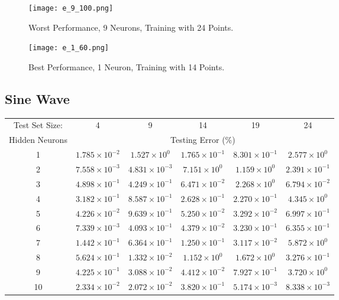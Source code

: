 \documentclass{article}
\begin{document}
		\begin{figure}[!ht]
			\texttt{[image: e\_9\_100.png]}
			\caption{Worst Performance, 9 Neurons, Training with 24 Points.}
			\label{F_E_1}
		\end{figure}
		\begin{figure}[!ht]
			\texttt{[image: e\_1\_60.png]}
			\caption{Best Performance, 1 Neuron, Training with 14 Points.}
			\label{F_E_2}
		\end{figure}
\pagebreak
	\subsection{Sine Wave}
		\begin{minipage}{\linewidth}
			\centering
			\begin{tabular}{c|ccccc}\label{T4}
				Test Set Size:  & 4 & 9 & 14 & 19 & 24 \\
				Hidden Neurons  & \multicolumn{5}{c}{Testing Error (\%)} \\
				\hline\noalign{\smallskip}
				1	& $1.785\times 10^{-2}$	& $1.527\times 10^{0}$ & $1.765\times 10^{-1}$ & $8.301\times 10^{-1}$ & $2.577\times 10^{0}$ \\
				2	& $7.558\times 10^{-3}$	& $4.831\times 10^{-3}$ & $7.151\times 10^{0}$ & $1.159\times 10^{0}$ & $2.391\times 10^{-1}$ \\
				3	& $4.898\times 10^{-1}$	& $4.249\times 10^{-1}$ & $6.471\times 10^{-2}$ & $2.268\times 10^{0}$ & $6.794\times 10^{-2}$ \\
				4	& $3.182\times 10^{-1}$	& $8.587\times 10^{-1}$ & $2.628\times 10^{-1}$ & $2.270\times 10^{-1}$ & $4.345\times 10^{0}$ \\
				5	& $4.226\times 10^{-2}$	& $9.639\times 10^{-1}$ & $5.250\times 10^{-2}$ & $3.292\times 10^{-2}$ & $6.997\times 10^{-1}$ \\
				6	& $7.339\times 10^{-3}$	& $4.093\times 10^{-1}$ & $4.379\times 10^{-2}$ & $3.230\times 10^{-1}$ & $6.355\times 10^{-1}$ \\
				7	& $1.442\times 10^{-1}$	& $6.364\times 10^{-1}$ & $1.250\times 10^{-1}$ & $3.117\times 10^{-2}$ & $5.872\times 10^{0}$ \\
				8	& $5.624\times 10^{-1}$	& $1.332\times 10^{-2}$ & $1.152\times 10^{0}$ & $1.672\times 10^{0}$ & $3.276\times 10^{-1}$ \\
				9	& $4.225\times 10^{-1}$	& $3.088\times 10^{-2}$ & $4.412\times 10^{-2}$ & $7.927\times 10^{-1}$ & $3.720\times 10^{0}$ \\
				10	& $2.334\times 10^{-2}$	& $2.072\times 10^{-2}$ & $3.820\times 10^{-1}$ & $5.174\times 10^{-3}$ & $8.338\times 10^{-3}$ \\
			\end{tabular}
		\end{minipage}
	
\end{document}
